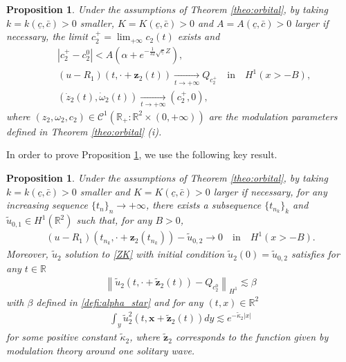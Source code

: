 \documentclass[reqno,10pt]{amsart}
\newtheorem{propo}[lemm]{Proposition}
\numberwithin{equation}{section}
\newcommand{\bx}{\mathbf{x}}
\newcommand{\bz}{\mathbf{z}}
\begin{document}
\begin{propo} \label{propo:asymp:2soliton} Under the assumptions of Theorem \ref{theo:orbital}, by taking $k=k(\underline{c},\bar{c})>0$ smaller, $K=K(\underline{c},\bar{c})>0$ and $A=A(\underline{c},\bar{c})>0$ larger if necessary, the limit $c_2^+=\lim_{+\infty}c_2(t)$ exists and
 \begin{align}
 & |c_2^+-c_2^0|<A \left( \alpha +e^{-\frac{1}{32} \sqrt{\underline{c}} Z}\right), \label{propo:asymp:2soliton.1} \\
 & \left(u -R_1 \right) (t, \cdot + \bz_2(t))\underset{t\rightarrow +\infty}{\rightarrow} Q_{c_2^+} \quad \text{in} \quad H^1(x >-B), \label{propo:asymp:2soliton.3} \\
 &(\dot{z}_2(t),\dot{\omega}_2(t)) \underset{t \rightarrow + \infty}{\longrightarrow} (c_2^+,0), \label{propo:asymp:2soliton.2}
 \end{align} 
 where $(z_2,\omega_2,c_2) \in \mathcal{C}^1(\mathbb R_+ : \mathbb R^2 \times (0,+\infty))$ are the modulation parameters defined in Theorem \ref{theo:orbital} (i).
 \end{propo}
 
In order to prove Proposition \ref{propo:asymp:2soliton}, we use the following key result.
	
	\begin{propo}\label{propo:limit_object_2}
		Under the assumptions of Theorem \ref{theo:orbital}, by taking $k=k(\underline{c},\bar{c})>0$ smaller and $K=K(\underline{c},\bar{c})>0$ larger if necessary, for any increasing sequence $\{t_n\}_n\rightarrow +\infty$, there exists a subsequence $\{t_{n_k}\}_k$ and $\tilde{u}_{0,1}\in H^1(\mathbb{R}^2)$ such that, for any $B>0$,
		\begin{align}\label{eq:conv_u-Q_c2}
			 \left( u -R_1 \right) \left( t_{n_k}, \cdot+ \bz_2(t_{n_k}) \right) - \tilde{u}_{0,2} \rightarrow 0 \quad \text{in} \quad H^1(x>-B).
		\end{align}
	Moreover, $\tilde{u}_2$ solution to \eqref{ZK} with initial condition $\tilde{u}_2(0)= \tilde{u}_{0,2}$ satisfies for any $t \in \mathbb{R}$
	\begin{align*}
		\left\| \tilde{u}_2 \left( t, \cdot + \tilde{\bz}_2(t) \right) -Q_{c_2^0} \right\|_{H^1} \lesssim \beta
	\end{align*}
with $\beta$ defined in \eqref{defi:alpha_star} and for any $(t,x)\in \mathbb{R}^2$
\begin{align*}
	\int_y \tilde{u}_2^2 \left(t, \bx + \tilde{\bz}_2(t) \right) dy \lesssim e^{-\tilde{\kappa}_2 \vert x \vert}
\end{align*}
for some positive constant $\tilde{\kappa}_2$, where $\tilde{\bz}_2$ corresponds to the function given by modulation theory around one solitary wave.
	\end{propo}
\end{document}
